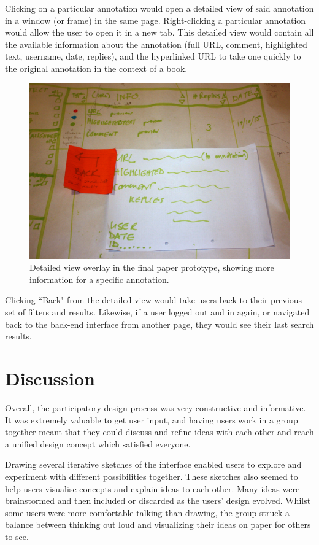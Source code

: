 Clicking on a particular annotation would open a detailed view of said annotation in a window (or frame) in the same page. Right-clicking a particular annotation would allow the user to open it in a new tab. This detailed view would contain all the available information about the annotation (full URL, comment, highlighted text, username, date, replies), and the hyperlinked URL to take one quickly to the original annotation in the context of a book.
\begin{figure}[h!]
    \centering
    \includegraphics[width=\textwidth]{Figures/IMG_9044.JPG}
 \caption{Detailed view overlay in the final paper prototype, showing more information for a specific annotation.}
\end{figure}
Clicking ``Back" from the detailed view would take users back to their previous set of filters and results. Likewise, if a user logged out and in again, or navigated back to the back-end interface from another page, they would see their last search results. 

\section{Discussion}
Overall, the participatory design process was very constructive and informative. It was extremely valuable to get user input, and having users work in a group together meant that they could discuss and refine ideas with each other and reach a unified design concept which satisfied everyone. 

Drawing several iterative sketches of the interface enabled users to explore and experiment with different possibilities together. These sketches also seemed to help users visualise concepts and explain ideas to each other. Many ideas were brainstormed and then included or discarded as the users' design evolved. Whilst some users were more comfortable talking than drawing, the group struck a balance between thinking out loud and visualizing their ideas on paper for others to see. 

